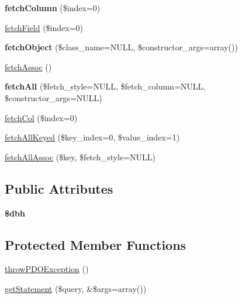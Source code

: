 \begin{DoxyCompactItemize}
\item 
\hypertarget{classDatabaseStatementPrefetch_a657fc96512f9afecd4e737b3dc4e4866}{
{\bfseries fetchColumn} (\$index=0)}
\label{classDatabaseStatementPrefetch_a657fc96512f9afecd4e737b3dc4e4866}

\item 
\hyperlink{classDatabaseStatementPrefetch_a98e507b8baa0b5aaf80fd51bd7989491}{fetchField} (\$index=0)
\item 
\hypertarget{classDatabaseStatementPrefetch_aa4b7f0f8096ed5dd0630bc30b99251a7}{
{\bfseries fetchObject} (\$class\_\-name=NULL, \$constructor\_\-args=array())}
\label{classDatabaseStatementPrefetch_aa4b7f0f8096ed5dd0630bc30b99251a7}

\item 
\hyperlink{classDatabaseStatementPrefetch_ac3c2ce6d7d81888a503d8508e5562d2f}{fetchAssoc} ()
\item 
\hypertarget{classDatabaseStatementPrefetch_afe1d9dc8e2d7974f7a139a82bf51032e}{
{\bfseries fetchAll} (\$fetch\_\-style=NULL, \$fetch\_\-column=NULL, \$constructor\_\-args=NULL)}
\label{classDatabaseStatementPrefetch_afe1d9dc8e2d7974f7a139a82bf51032e}

\item 
\hyperlink{classDatabaseStatementPrefetch_abf394498c6665e5f89c02e5e4a6292e1}{fetchCol} (\$index=0)
\item 
\hyperlink{classDatabaseStatementPrefetch_af374c6fa26265fe1cf9cd0cf87260849}{fetchAllKeyed} (\$key\_\-index=0, \$value\_\-index=1)
\item 
\hyperlink{classDatabaseStatementPrefetch_a74915ad2c601fa0bf4a9a43ad6180a94}{fetchAllAssoc} (\$key, \$fetch\_\-style=NULL)
\end{DoxyCompactItemize}
\subsection*{Public Attributes}
\begin{DoxyCompactItemize}
\item 
\hypertarget{classDatabaseStatementPrefetch_a0554231be3e10e3283ba00eeee82097a}{
{\bfseries \$dbh}}
\label{classDatabaseStatementPrefetch_a0554231be3e10e3283ba00eeee82097a}

\end{DoxyCompactItemize}
\subsection*{Protected Member Functions}
\begin{DoxyCompactItemize}
\item 
\hyperlink{classDatabaseStatementPrefetch_a07a6febdb1ad94b1ee66b926fad800b2}{throwPDOException} ()
\item 
\hyperlink{classDatabaseStatementPrefetch_a08ef92c5108225cdd2e02885ca2aeea4}{getStatement} (\$query, \&\$args=array())
\end{DoxyCompactItemize}
